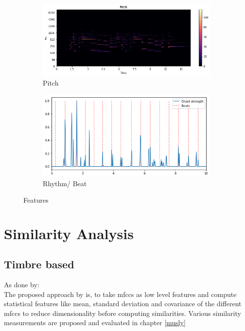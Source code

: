 \begin{figure}[htbp]
{{			\begin{subfigure}{.495\textwidth}
				\centering
				\includegraphics[scale=0.3]{Images/Layla/laylapitch.png}
				\caption{Pitch}
				\label{laylapitch}
			\end{subfigure}%
			\begin{subfigure}{.495\textwidth}
				\centering     
				\includegraphics[scale=0.3]{Images/Layla/laylabeat.png}
				\caption{Rhythm/ Beat}
				\label{laylacbeat}
			\end{subfigure}%
	}}
	\caption{Features}
	\label{fig:feat2}
\end{figure}

\section{Similarity Analysis}

\subsection{Timbre based}

As done by: \cite{schnitzer1}\\
The proposed approach by \cite{schnitzer1} is, to take mfccs as low level features and compute statistical features like mean, standard deviation and covariance of the different mfccs to reduce dimensionality before computing similarities.
Various similarity measurements are proposed and evaluated in chapter \ref{musly}

